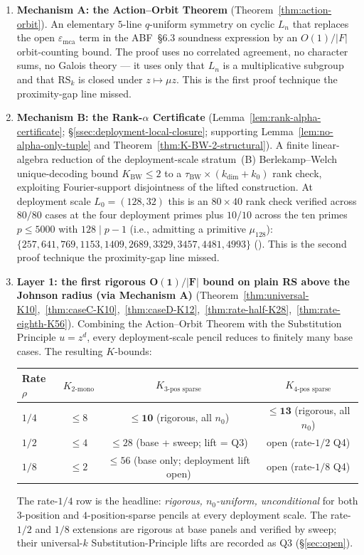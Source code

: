 \documentclass[11pt]{article}
\theoremstyle{definition}
\theoremstyle{remark}
\begin{document}
\begin{enumerate}[label=(\arabic*),leftmargin=1.5em]
\item \textbf{Mechanism A: the Action--Orbit Theorem}
(Theorem~\ref{thm:action-orbit}). An elementary $5$-line
$q$-uniform symmetry on cyclic $L_n$ that replaces the open
$\varepsilon_{\mathrm{mca}}$ term in the ABF~\S 6.3 soundness
expression by an $O(1)/|F|$ orbit-counting bound. The proof uses no
correlated agreement, no character sums, no Galois theory --- it
uses only that $L_n$ is a multiplicative subgroup and that
$\mathrm{RS}_k$ is closed under $z \mapsto \mu z$. This is the
first proof technique the proximity-gap line missed.

\item \textbf{Mechanism B: the Rank-$\alpha$ Certificate}
(Lemma~\ref{lem:rank-alpha-certificate};
\S\ref{ssec:deployment-local-closure}; supporting
Lemma~\ref{lem:no-alpha-only-tuple} and
Theorem~\ref{thm:K-BW-2-structural}). A finite linear-algebra reduction
of the deployment-scale stratum~(B) Berlekamp--Welch
unique-decoding bound $K_{\mathrm{BW}} \leq 2$ to a
$\tau_{\mathrm{BW}} \times (k_{\dim} + k_0)$ rank check, exploiting
Fourier-support disjointness of the lifted construction.
At deployment scale $L_0 = (128, 32)$ this is an $80 \times 40$ rank
check verified across $80/80$ cases at the four deployment primes plus
$10/10$ across the ten primes $p \leq 5000$ with
$128 \mid p - 1$ (i.e., admitting a primitive $\mu_{128}$):
$\{257, 641, 769, 1153, 1409, 2689, 3329, 3457, 4481, 4993\}$
(\cite{CompanionRepo}). This is the second proof
technique the proximity-gap line missed.

\item \textbf{Layer 1: the first rigorous $\boldsymbol{O(1)/|F|}$ bound on
plain RS above the Johnson radius (via Mechanism A)}
(Theorem~\ref{thm:universal-K10},~\ref{thm:caseC-K10},~\ref{thm:caseD-K12},~\ref{thm:rate-half-K28},~\ref{thm:rate-eighth-K56}).
Combining the Action--Orbit Theorem with the Substitution Principle
$u = z^d$, every deployment-scale pencil reduces to finitely many
base cases. The resulting $K$-bounds:
\begin{center}\small
\begin{tabular}{l c c c}
\toprule
Rate $\rho$ & $K_{2\text{-mono}}$ & $K_{3\text{-pos sparse}}$ & $K_{4\text{-pos sparse}}$ \\
\midrule
$1/4$ & $\leq 8$ & $\boldsymbol{\leq 10}$ (rigorous, all $n_0$) & $\boldsymbol{\leq 13}$ (rigorous, all $n_0$) \\
$1/2$ & $\leq 4$ & $\leq 28$ (base + sweep; lift = Q3) & open (rate-$1/2$ Q4) \\
$1/8$ & $\leq 2$ & $\leq 56$ (base only; deployment lift open) & open (rate-$1/8$ Q4) \\
\bottomrule
\end{tabular}
\end{center}
The rate-$1/4$ row is the headline: \emph{rigorous, $n_0$-uniform,
unconditional} for both $3$-position and $4$-position-sparse pencils
at every deployment scale. The rate-$1/2$ and $1/8$ extensions are
rigorous at base panels and verified by sweep; their universal-$k$
Substitution-Principle lifts are recorded as Q3 (\S\ref{sec:open}).


\end{enumerate}
\end{document}

